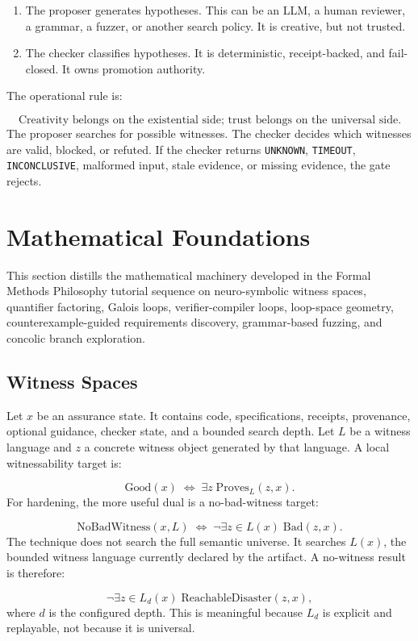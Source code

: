 \documentclass[11pt]{article}
\begin{document}
\begin{enumerate}
\item The proposer generates hypotheses. This can be an LLM, a human reviewer, a
grammar, a fuzzer, or another search policy. It is creative, but not trusted.
\item The checker classifies hypotheses. It is deterministic, receipt-backed, and
fail-closed. It owns promotion authority.
\end{enumerate}
The operational rule is:

\[
\text{Creativity belongs on the existential side; trust belongs on the
universal side.}
\]
The proposer searches for possible witnesses. The checker decides which witnesses are valid, blocked, or refuted. If the checker returns \texttt{UNKNOWN}, \texttt{TIMEOUT}, \texttt{INCONCLUSIVE}, malformed input, stale evidence, or missing evidence, the gate rejects.

\section{Mathematical Foundations}
This section distills the mathematical machinery developed in the Formal Methods Philosophy tutorial sequence on neuro-symbolic witness spaces, quantifier factoring, Galois loops, verifier-compiler loops, loop-space geometry, counterexample-guided requirements discovery, grammar-based fuzzing, and concolic branch exploration.

\subsection{Witness Spaces}
Let $x$ be an assurance state. It contains code, specifications, receipts, provenance, optional guidance, checker state, and a bounded search depth. Let $L$ be a witness language and $z$ a concrete witness object generated by that language. A local witnessability target is:

\[
\mathrm{Good}(x)\;\Longleftrightarrow\;\exists z\;\mathrm{Proves}_{L}(z,x).
\]
For hardening, the more useful dual is a no-bad-witness target:

\[
\mathrm{NoBadWitness}(x,L)
\;\Longleftrightarrow\;
\neg\exists z\in L(x)\;\mathrm{Bad}(z,x).
\]
The technique does not search the full semantic universe. It searches $L(x)$, the bounded witness language currently declared by the artifact. A no-witness result is therefore:

\[
\neg\exists z\in L_d(x)\;\mathrm{ReachableDisaster}(z,x),
\]
where $d$ is the configured depth. This is meaningful because $L_d$ is explicit and replayable, not because it is universal.
\end{document}
